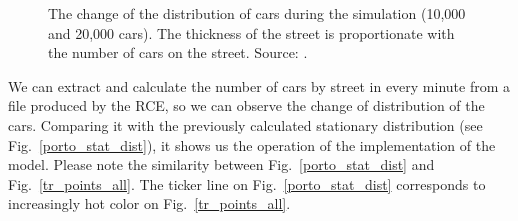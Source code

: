 \documentclass[b5paper,12pt]{report}
\theoremstyle{definition}
\begin{document}
\begin{figure}[!h]
    \hspace{0em}
    \hspace{0em}
    \hspace{0em}
    \caption{The change of the distribution of cars during the simulation (10,000 and 20,000 cars). The thickness of the street is proportionate with the number of cars on the street. Source: \cite{traffic-paper}.}
    \label{cardist}
\end{figure}

We can extract and calculate the number of cars by street in every minute from a file produced by the RCE, so we can observe the change of distribution of the cars. Comparing it with the previously calculated stationary distribution (see Fig.~\ref{porto_stat_dist}), it shows us the operation of the implementation of the model. Please note the similarity between Fig.~\ref{porto_stat_dist} and Fig.~\ref{tr_points_all}. The ticker line on Fig.~\ref{porto_stat_dist} corresponds to increasingly hot color on Fig.~\ref{tr_points_all}.
\end{document}
